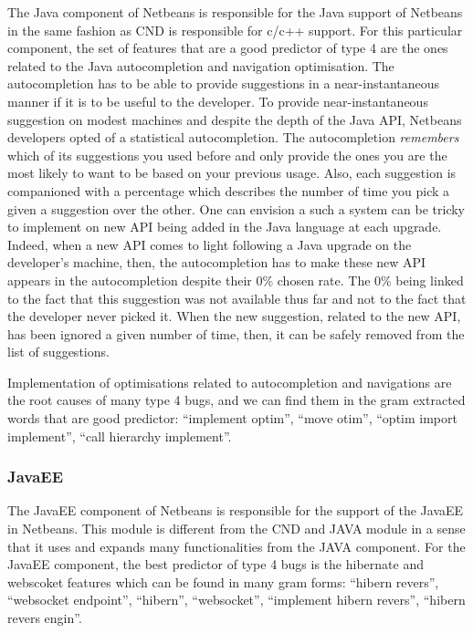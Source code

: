 \documentclass[12pt]{report}
\begin{document}
The Java component of Netbeans is responsible for the Java support of
Netbeans in the same fashion as CND is responsible for c/c++ support.
For this particular component, the set of features that are a good
predictor of type 4 are the ones related to the Java autocompletion and
navigation optimisation. The autocompletion has to be able to provide
suggestions in a near-instantaneous manner if it is to be useful to the
developer. To provide near-instantaneous suggestion on modest machines
and despite the depth of the Java API, Netbeans developers opted of a
statistical autocompletion. The autocompletion \emph{remembers} which of
its suggestions you used before and only provide the ones you are the
most likely to want to be based on your previous usage. Also, each
suggestion is companioned with a percentage which describes the number
of time you pick a given a suggestion over the other. One can envision a
such a system can be tricky to implement on new API being added in the
Java language at each upgrade. Indeed, when a new API comes to light
following a Java upgrade on the developer's machine, then, the
autocompletion has to make these new API appears in the autocompletion
despite their 0\% chosen rate. The 0\% being linked to the fact that
this suggestion was not available thus far and not to the fact that the
developer never picked it. When the new suggestion, related to the new
API, has been ignored a given number of time, then, it can be safely
removed from the list of suggestions.

Implementation of optimisations related to autocompletion and
navigations are the root causes of many type 4 bugs, and we can find
them in the gram extracted words that are good predictor: ``implement
optim'', ``move otim'', ``optim import implement'', ``call hierarchy
implement''.

\subsubsection{JavaEE}\label{javaee}

The JavaEE component of Netbeans is responsible for the support of the
JavaEE in Netbeans. This module is different from the CND and JAVA
module in a sense that it uses and expands many functionalities from the
JAVA component. For the JavaEE component, the best predictor of type 4
bugs is the hibernate and webscoket features which can be found in many
gram forms: ``hibern revers'', ``websocket endpoint'', ``hibern'',
``websocket'', ``implement hibern revers'', ``hibern revers engin''.
\end{document}
